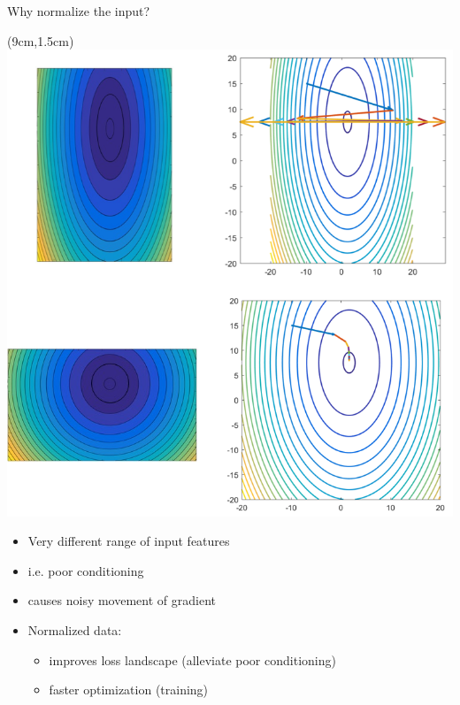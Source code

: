 \documentclass[serif, aspectratio=169]{beamer}
\begin{document}
\begin{frame}{Why normalize the input?}
	
	\begin{textblock*}{5cm}(9cm,1.5cm) %
		\includegraphics[keepaspectratio, scale=0.25]{pic/poorcond}
	\end{textblock*}
	
	\begin{itemize}
		\item Very different range of input features
		\item i.e. poor conditioning
		\item causes noisy movement of gradient
	\end{itemize}
	\vspace{1.5cm}
	\begin{itemize}
		\item Normalized data:
		\begin{itemize}
			\item improves loss landscape \newline (alleviate poor conditioning)
			\item faster optimization (training)
		\end{itemize}
	\end{itemize}
	
\end{frame}
\end{document}
